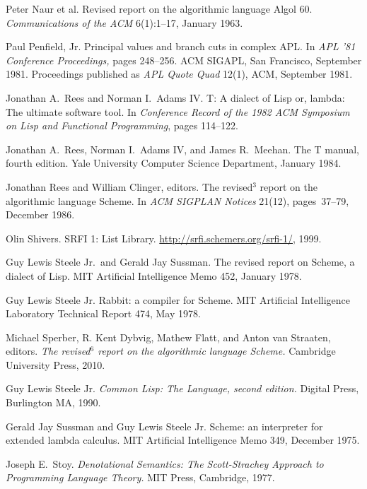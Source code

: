 \begin{thebibliography}{999}
Peter Naur et al.
Revised report on the algorithmic language Algol 60.
{\em Communications of the ACM} 6(1):1--17, January 1963.

Paul Penfield, Jr.
Principal values and branch cuts in complex APL.
In {\em APL '81 Conference Proceedings,} pages 248--256.
ACM SIGAPL, San Francisco, September 1981.
Proceedings published as {\em APL Quote Quad} 12(1), ACM, September 1981.

Jonathan A.~Rees and Norman I.~Adams IV.
T: A dialect of Lisp or, lambda: The ultimate software tool.
In {\em Conference Record of the 1982 ACM Symposium on Lisp and
  Functional Programming}, pages 114--122.

Jonathan A.~Rees, Norman I.~Adams IV, and James R.~Meehan.
The T manual, fourth edition.
Yale University Computer Science Department, January 1984.

Jonathan Rees and William Clinger, editors.
The revised$^3$ report on the algorithmic language Scheme.
In {\em ACM SIGPLAN Notices} 21(12), pages~37--79, December 1986.

Olin Shivers.
SRFI 1: List Library.
\url{http://srfi.schemers.org/srfi-1/}, 1999.

Guy Lewis Steele Jr.~and Gerald Jay Sussman.
The revised report on Scheme, a dialect of Lisp.
MIT Artificial Intelligence Memo 452, January 1978.

Guy Lewis Steele Jr.
Rabbit: a compiler for Scheme.
MIT Artificial Intelligence Laboratory Technical Report 474, May 1978.

Michael Sperber, R. Kent Dybvig, Mathew Flatt, and Anton van Straaten, editors.
{\em The revised$^6$ report on the algorithmic language Scheme.}
Cambridge University Press, 2010.

Guy Lewis Steele Jr.
{\em Common Lisp: The Language, second edition.}
Digital Press, Burlington MA, 1990.

Gerald Jay Sussman and Guy Lewis Steele Jr.
Scheme: an interpreter for extended lambda calculus.
MIT Artificial Intelligence Memo 349, December 1975.

Joseph E.~Stoy.
{\em Denotational Semantics: The Scott-Strachey Approach to
  Programming Language Theory.}
MIT Press, Cambridge, 1977.


\end{thebibliography}
